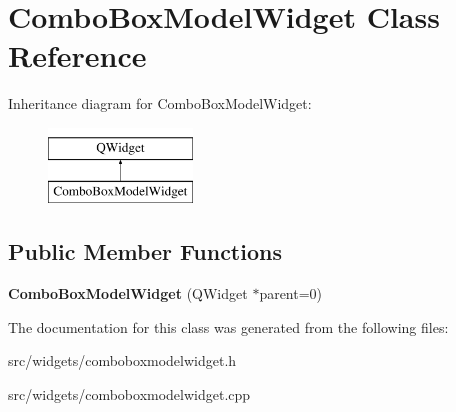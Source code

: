 \hypertarget{classComboBoxModelWidget}{\section{Combo\+Box\+Model\+Widget Class Reference}
\label{classComboBoxModelWidget}
}
Inheritance diagram for Combo\+Box\+Model\+Widget\+:\begin{figure}[H]
\begin{center}
\leavevmode
\includegraphics[height=2.000000cm]{d5/d79/classComboBoxModelWidget}
\end{center}
\end{figure}
\subsection*{Public Member Functions}
\begin{DoxyCompactItemize}
\item 
\hypertarget{classComboBoxModelWidget_a8632edda11e66ee50cfc89729b2feb3a}{{\bfseries Combo\+Box\+Model\+Widget} (Q\+Widget $\ast$parent=0)}\label{classComboBoxModelWidget_a8632edda11e66ee50cfc89729b2feb3a}

\end{DoxyCompactItemize}


The documentation for this class was generated from the following files\+:\begin{DoxyCompactItemize}
\item 
src/widgets/comboboxmodelwidget.\+h\item 
src/widgets/comboboxmodelwidget.\+cpp\end{DoxyCompactItemize}
